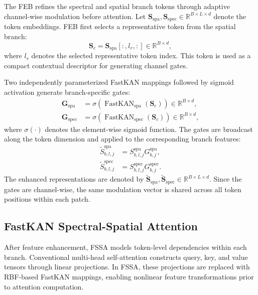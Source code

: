 \documentclass{ieeeaccess}
\begin{document}
The FEB refines the spectral and spatial branch tokens through adaptive channel-wise modulation before attention. Let
$\mathbf{S}_{\mathrm{spa}},\mathbf{S}_{\mathrm{spec}}\in\mathbb{R}^{B\times L\times d}$ denote the token embeddings. FEB first selects a representative token from the spatial branch:
\begin{equation}
\mathbf{S}_{c}
=
\mathbf{S}_{\mathrm{spa}}[:,l_r,:]
\in
\mathbb{R}^{B\times d},
\label{eq:feb_anchor}
\end{equation}
where $l_r$ denotes the selected representative token index. This token is used as a compact contextual descriptor for generating channel gates.

Two independently parameterized FastKAN mappings followed by sigmoid activation generate branch-specific gates:
\begin{equation}
\begin{aligned}
\mathbf{G}_{\mathrm{spa}}
&=
\sigma\left(
\operatorname{FastKAN}_{\mathrm{spa}}(\mathbf{S}_{c})
\right)
\in
\mathbb{R}^{B\times d}, \\
\mathbf{G}_{\mathrm{spec}}
&=
\sigma\left(
\operatorname{FastKAN}_{\mathrm{spec}}(\mathbf{S}_{c})
\right)
\in
\mathbb{R}^{B\times d},
\end{aligned}
\label{eq:feb_gate}
\end{equation}
where $\sigma(\cdot)$ denotes the element-wise sigmoid function. The gates are broadcast along the token dimension and applied to the corresponding branch features:
\begin{equation}
\begin{aligned}
\widetilde{S}^{\mathrm{spa}}_{b,l,j}
&=
S^{\mathrm{spa}}_{b,l,j}
G^{\mathrm{spa}}_{b,j}, \\
\widetilde{S}^{\mathrm{spec}}_{b,l,j}
&=
S^{\mathrm{spec}}_{b,l,j}
G^{\mathrm{spec}}_{b,j}.
\end{aligned}
\label{eq:feb_output}
\end{equation}
The enhanced representations are denoted by
$\widetilde{\mathbf{S}}_{\mathrm{spa}},\widetilde{\mathbf{S}}_{\mathrm{spec}}\in\mathbb{R}^{B\times L\times d}$. Since the gates are channel-wise, the same modulation vector is shared across all token positions within each patch.

\subsection{FastKAN Spectral-Spatial Attention}
\label{sec:fssa}

After feature enhancement, FSSA models token-level dependencies within each branch. Conventional multi-head self-attention constructs query, key, and value tensors through linear projections. In FSSA, these projections are replaced with RBF-based FastKAN mappings, enabling nonlinear feature transformations prior to attention computation.
\end{document}
